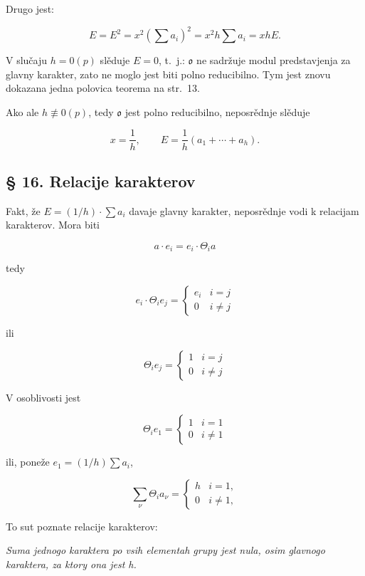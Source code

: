 \documentclass[11pt]{article}
\begin{document}
Drugo jest:

\[
E=E^2=x^2\left(\sum a_i\right)^2=x^2h\sum a_i=xhE.
\]

V slučaju \(h=0(p)\) slěduje \(E=0\), t.~j.: \(\mathfrak o\) ne sadržuje modul predstavjenja za glavny karakter, zato ne moglo jest biti polno reducibilno. Tym jest znovu dokazana jedna polovica teorema na str.~13.

Ako ale \(h\not\equiv0(p)\), tedy \(\mathfrak o\) jest polno reducibilno, neposrědnje slěduje

\[
x=\frac{1}{h},\qquad E=\frac{1}{h}(a_1+\cdots+a_h).
\]

\subsection*{§ 16. Relacije karakterov}\label{die-charakterenrelationen}

Fakt, že \(E=(1/h)\cdot\sum a_i\) davaje glavny karakter, neposrědnje vodi k relacijam karakterov. Mora biti

\[a \cdot e_i = e_i \cdot \Theta_i a\]

tedy

\[e_i \cdot \Theta_i e_j = \begin{cases} e_i & i = j \\ 0 & i \neq j \end{cases}\]

ili

\[\Theta_i e_j = \begin{cases} 1 & i = j \\ 0 & i \neq j \end{cases}\]

V osoblivosti jest

\[\Theta_i e_1 = \begin{cases} 1 & i = 1 \\ 0 & i \neq 1 \end{cases}\]

ili, poneže \(e_1 = (1/h) \sum a_i\),

\[
\sum_\nu \Theta_i a_\nu=\begin{cases} h & i=1,\\ 0 & i\ne 1, \end{cases}
\]

To sut poznate relacije karakterov:

\emph{Suma jednogo karaktera po vsih elementah grupy jest nula, osim glavnogo karaktera, za ktory ona jest h.}

\end{document}
